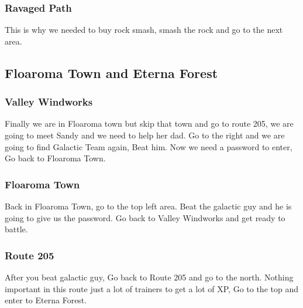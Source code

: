 \documentclass[11pt]{article}
\begin{document}




\subsubsection{Ravaged Path}\label{subsubsec:ravaged_path2}
This is why we needed to buy rock smash, smash the rock and go to the next area.





\subsection{Floaroma Town and Eterna Forest}\label{subsec:floaroma-town-and-eterna-forest}

\subsubsection{Valley Windworks}\label{subsubsec:valley-windworks}
Finally we are in Floaroma town but skip that town and go to route 205,
we are going to meet Sandy and we need to help her dad.
Go to the right and we are going to find Galactic Team again, Beat him.
Now we need a password to enter, Go back to Floaroma Town.





\subsubsection{Floaroma Town}\label{subsubsec:floaroma-town}
Back in Floaroma Town, go to the top left area.
Beat the galactic guy and he is going to give us the password.
Go back to Valley Windworks and get ready to battle.

\subsubsection{Route 205}\label{subsubsec:route_205}
After you beat galactic guy, Go back to Route 205 and go to the north.
Nothing important in this route just a lot of trainers to get a lot of XP,
Go to the top and enter to Eterna Forest.
\end{document}
